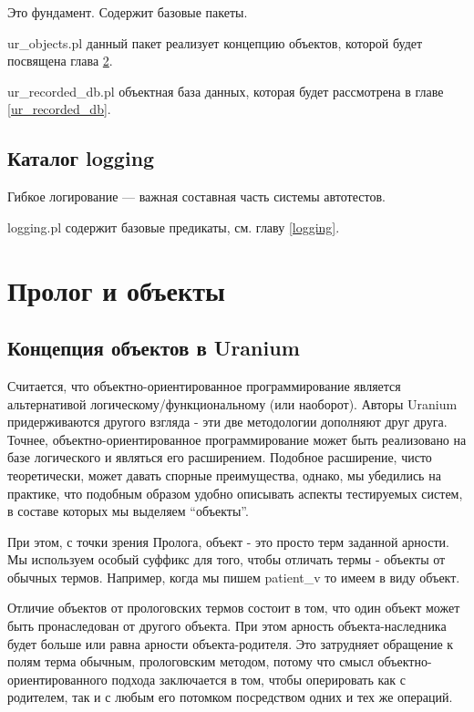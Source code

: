 \documentclass[a4paper]{book}
\def\ur{Uranium}
\begin{document}
Это фундамент. Содержит базовые пакеты.

\begin{description} 
\item ur\_objects.pl данный пакет реализует концепцию
  объектов, которой будет посвящена глава \ref{ur_objects}.
\item ur\_recorded\_db.pl объектная база данных, которая
  будет рассмотрена в главе \ref{ur_recorded_db}.
\end{description}

\section{Каталог logging}

Гибкое логирование --- важная составная часть системы автотестов.

\begin{description}
\item logging.pl содержит базовые предикаты, см. главу
  \ref{logging}.
\end{description}

\chapter{Пролог и объекты}
\label{ur_objects}

\section{Концепция объектов в \ur}
Считается, что объектно-ориентированное программирование является
альтернативой логическому/функциональному (или наоборот). Авторы
\ur{} придерживаются другого взгляда - эти две методологии
дополняют друг друга. Точнее, объектно-ориентированное
программирование может быть реализовано на базе логического и
являться его расширением. Подобное расширение, чисто
теоретически, может давать спорные преимущества, однако, мы
убедились на практике, что подобным образом удобно описывать
аспекты тестируемых систем, в составе которых мы выделяем
``объекты''. 

При этом, с точки зрения Пролога, объект - это просто терм
заданной арности. Мы используем особый суффикс для того, чтобы
отличать термы - объекты от обычных термов. Например, когда мы
пишем patient\_v то имеем в виду объект. 

Отличие объектов от прологовских термов состоит в том, что один
объект может быть пронаследован от другого объекта. При этом
арность объекта-наследника будет больше или равна арности
объекта-родителя. Это затрудняет обращение к полям терма обычным,
прологовским методом, потому что смысл объектно-ориентированного
подхода заключается в том, чтобы оперировать как с родителем, так
и с любым его потомком посредством одних и тех же операций.
\end{document}
